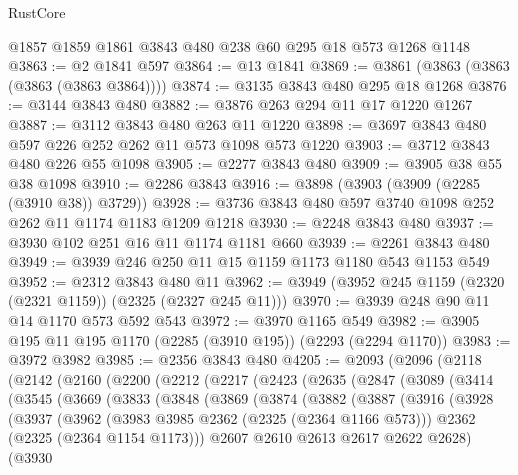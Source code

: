 \begin{lexlean}{RustCore}
\begin{coremodule}
    @1857
    @1859
    @1861
    @3843
    @480
    @238
    @60
    @295
    @18
    @573
    @1268
    @1148
@3863 := @2 @1841 @597
@3864 := @13 @1841
@3869 := @3861 (@3863 (@3863 (@3863 (@3863 @3864))))
@3874 := @3135 @3843 @480 @295 @18 @1268
@3876 := @3144 @3843 @480
@3882 := @3876 @263 @294 @11 @17 @1220 @1267
@3887 := @3112 @3843 @480 @263 @11 @1220
@3898 := @3697 @3843 @480 @597 @226 @252 @262 @11 @573 @1098 @573 @1220
@3903 := @3712 @3843 @480 @226 @55 @1098
@3905 := @2277 @3843 @480
@3909 := @3905 @38 @55 @38 @1098
@3910 := @2286 @3843
@3916 := @3898 (@3903 (@3909 (@2285 (@3910 @38)) @3729))
@3928 := @3736 @3843 @480 @597 @3740 @1098 @252 @262 @11 @1174 @1183 @1209 @1218
@3930 := @2248 @3843 @480
@3937 := @3930 @102 @251 @16 @11 @1174 @1181 @660
@3939 := @2261 @3843 @480
@3949 := @3939 @246 @250 @11 @15 @1159 @1173 @1180 @543 @1153 @549
@3952 := @2312 @3843 @480 @11
@3962 := @3949 (@3952 @245 @1159 (@2320 (@2321 @1159)) (@2325 (@2327 @245 @11)))
@3970 := @3939 @248 @90 @11 @14 @1170 @573 @592 @543
@3972 := @3970 @1165 @549
@3982 := @3905 @195 @11 @195 @1170 (@2285 (@3910 @195)) (@2293 (@2294 @1170))
@3983 := @3972 @3982
@3985 := @2356 @3843 @480
@4205 := @2093
    (@2096
      (@2118
        (@2142
          (@2160
            (@2200
              (@2212
                (@2217
                  (@2423
                    (@2635
                      (@2847
                        (@3089
                          (@3414
                            (@3545
                              (@3669
                                (@3833
                                  (@3848
                                    (@3869
                                      (@3874
                                        (@3882
                                          (@3887
                                            (@3916
                                              (@3928
                                                (@3937
                                                  (@3962
                                                    (@3983 @3985 @2362 (@2325 (@2364 @1166 @573)))
                                                    @2362
                                                    (@2325 (@2364 @1154 @1173)))
                                                  @2607
                                                  @2610
                                                  @2613
                                                  @2617
                                                  @2622
                                                  @2628)
                                                (@3930

\end{coremodule}
\end{lexlean}
